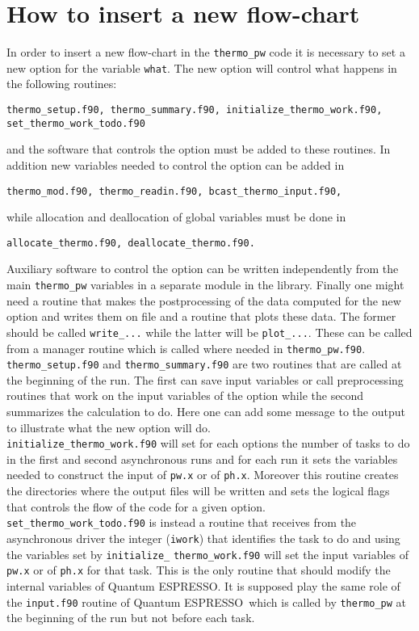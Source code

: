 \documentclass[12pt,a4paper,twoside]{report}
\def\qe{{\sc Quantum ESPRESSO}}
\begin{document}
\newpage
{\color{dark-blue}\chapter{How to insert a new flow-chart}}
\color{black}
In order to insert a new flow-chart in the \texttt{thermo\_pw} code it
is necessary to set a new option for the variable \texttt{what}. The
new option will control what happens in the following routines:
\begin{verbatim}
thermo_setup.f90, thermo_summary.f90, initialize_thermo_work.f90, 
set_thermo_work_todo.f90
\end{verbatim}
and the software that controls the option must be added to these routines.
In addition new variables needed to control the option can be added
in 
\begin{verbatim}
thermo_mod.f90, thermo_readin.f90, bcast_thermo_input.f90,
\end{verbatim}
while allocation and deallocation of global variables must be done
in 
\begin{verbatim}
allocate_thermo.f90, deallocate_thermo.f90.
\end{verbatim}
Auxiliary software to control the option can be written independently
from the main \texttt{thermo\_pw} variables in a separate
module in the library. Finally one might need a routine that makes the
postprocessing of the data computed for the new option and writes them on
file and a routine that plots these data. The former should be called 
\texttt{write\_...} while the latter will be \texttt{plot\_...}.
These can be called from a manager routine which is called where needed
in \texttt{thermo\_pw.f90}. \\
\texttt{thermo\_setup.f90} and \texttt{thermo\_summary.f90} are two routines 
that are called at the beginning of the run. The first
can save input variables or call preprocessing routines that work on 
the input variables of the option while the second summarizes the 
calculation to do. Here one can add some message to the output to 
illustrate what the new option will do. \\ 
\texttt{initialize\_thermo\_work.f90} will set for each options the
number of tasks to do in the first and second asynchronous runs and
for each run it sets the variables needed to construct the
input of \texttt{pw.x} or of \texttt{ph.x}. Moreover this routine creates
the directories where the output files will be written and sets the
logical flags that controls the flow of the code for a given option. \\
\texttt{set\_thermo\_work\_todo.f90} is instead a routine that receives
from the asynchronous driver the integer (\texttt{iwork}) that identifies
the task to do and using the variables set by
\texttt{initialize\_} \texttt{thermo\_work.f90} will set the input variables
of \texttt{pw.x} or of \texttt{ph.x} for that task. This is the only 
routine that should modify the internal variables of \qe. It is supposed
play the same role of the \texttt{input.f90} routine of \qe\  
which is called by \texttt{thermo\_pw} at the beginning of the run
but not before each task.
\end{document}
